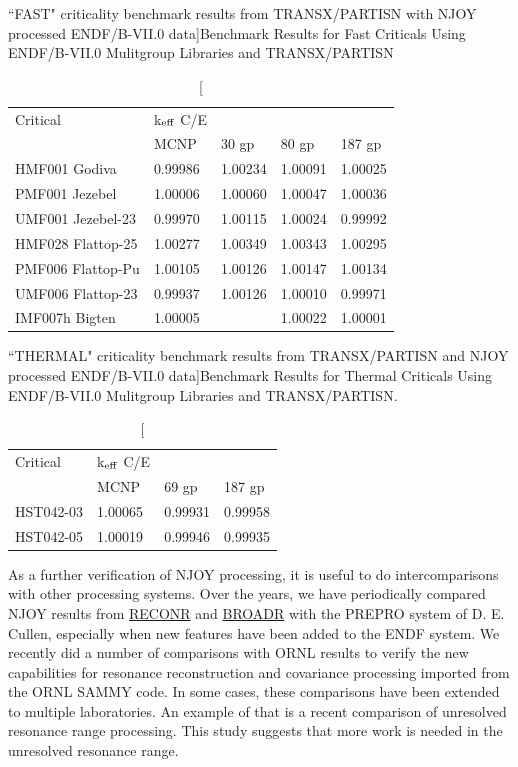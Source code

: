 \begin{table}[tp]
\caption[``FAST" criticality benchmark results from TRANSX/PARTISN
 with NJOY processed ENDF/B-VII.0 data]{Benchmark Results for Fast
 Criticals Using ENDF/B-VII.0 Mulitgroup Libraries and TRANSX/PARTISN}
\setlength{\extrarowheight}{1pt}
\begin{center}
\begin{tabular}{lllll}
Critical & k$_{\rm eff}$ C/E \\
                  & MCNP  &   30 gp   & 80 gp   &  187 gp \\ \hline
HMF001 Godiva     & 0.99986 & 1.00234 & 1.00091 & 1.00025 \\
PMF001 Jezebel    & 1.00006 & 1.00060 & 1.00047 & 1.00036 \\
UMF001 Jezebel-23 & 0.99970 & 1.00115 & 1.00024 & 0.99992 \\
HMF028 Flattop-25 & 1.00277 & 1.00349 & 1.00343 & 1.00295 \\
PMF006 Flattop-Pu & 1.00105 & 1.00126 & 1.00147 & 1.00134 \\
UMF006 Flattop-23 & 0.99937 & 1.00126 & 1.00010 & 0.99971 \\
IMF007h Bigten    & 1.00005 &         & 1.00022 & 1.00001 \\ \hline
\end{tabular}
\end{center}
\label{mg1}
\end{table}

\begin{table}[bp]
\caption[``THERMAL" criticality benchmark results from TRANSX/PARTISN
 and NJOY processed ENDF/B-VII.0 data]{Benchmark Results for Thermal
 Criticals Using ENDF/B-VII.0 Mulitgroup Libraries and TRANSX/PARTISN.}
\begin{center}
\begin{tabular}{llll}
Critical & k$_{\rm eff}$ C/E \\
         &  MCNP   & 69 gp   &   187 gp  \\ \hline
HST042-03 & 1.00065 & 0.99931 & 0.99958 \\
HST042-05 & 1.00019 & 0.99946 & 0.99935 \\ \hline
\end{tabular}
\end{center}
\label{mg2}
\end{table}

As a further verification of NJOY processing, it is useful to do
intercomparisons with other processing systems.  Over the years,
we have periodically compared NJOY results from
\hyperlink{sRECONRhy}{RECONR} and \hyperlink{sBROADRhy}{BROADR}
with the PREPRO system of D. E. Cullen\cite{PREPRO}, especially
when new features have been added to the ENDF system.  We recently
did a number of comparisons with ORNL results to verify the new
capabilities for resonance reconstruction and covariance processing
imported from the ORNL SAMMY code.  In some cases, these
comparisons have been extended to multiple laboratories.  An
example of that is a recent comparison of unresolved resonance
range processing\cite{sublet}.  This study suggests that more work
is needed in the unresolved resonance range.

